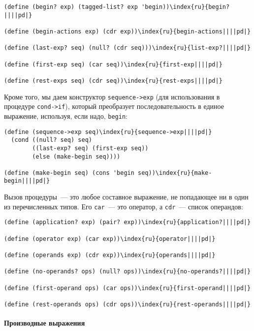 \begin{plainlist}
\begin{Verbatim}[fontsize=\small]
(define (begin? exp) (tagged-list? exp 'begin))\index{ru}{begin?||||pd|}

(define (begin-actions exp) (cdr exp))\index{ru}{begin-actions||||pd|}

(define (last-exp? seq) (null? (cdr seq)))\index{ru}{list-exp?||||pd|}

(define (first-exp seq) (car seq))\index{ru}{first-exp||||pd|}

(define (rest-exps seq) (cdr seq))\index{ru}{rest-exps||||pd|}
\end{Verbatim}
Кроме того, мы даем конструктор {\tt sequence->exp} (для
использования в процедуре {\tt cond->if}), который преобразует
последовательность в единое выражение, используя, если надо,
{\tt begin}:

\begin{Verbatim}[fontsize=\small]
(define (sequence->exp seq)\index{ru}{sequence->exp||||pd|}
  (cond ((null? seq) seq)
        ((last-exp? seq) (first-exp seq))
        (else (make-begin seq))))

(define (make-begin seq) (cons 'begin seq))\index{ru}{make-begin||||pd|}
\end{Verbatim}

\item
Вызов процедуры~--- это любое составное
выражение, не попадающее ни в один из перечисленных типов.  Его
{\tt car}~--- это оператор, а {\tt cdr}~--- список операндов:

\begin{Verbatim}[fontsize=\small]
(define (application? exp) (pair? exp))\index{ru}{application?||||pd|}

(define (operator exp) (car exp))\index{ru}{operator||||pd|}

(define (operands exp) (cdr exp))\index{ru}{operands||||pd|}

(define (no-operands? ops) (null? ops))\index{ru}{no-operands?||||pd|}

(define (first-operand ops) (car ops))\index{ru}{first-operand||||pd|}

(define (rest-operands ops) (cdr ops))\index{ru}{rest-operands||||pd|}
\end{Verbatim}
\end{plainlist}

\paragraph{Производные выражения}


